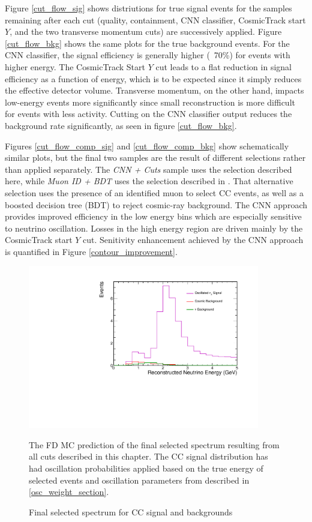 Figure \ref{cut_flow_sig} shows distriutions for true signal
events for the samples
remaining after each cut (quality, containment, CNN classifier,
CosmicTrack start
$Y$, and the two transverse momentum cuts) are successively applied.
Figure \ref{cut_flow_bkg} shows the same plots for the true background events.
For the CNN classifier, the signal efficiency is generally higher (~70\%)
for events with higher energy.
The CosmicTrack Start $Y$ cut leads to a flat reduction in signal efficiency
as a function of energy, which is to be expected since it simply reduces
the effective detector volume.
Transverse momentum, on the other hand, impacts low-energy events more
significantly since small reconstruction is more difficult for events
with less activity.
Cutting on the CNN classifier output reduces the background rate significantly,
as seen in figure \ref{cut_flow_bkg}.

Figures \ref{cut_flow_comp_sig} and \ref{cut_flow_comp_bkg} show
schematically similar plots, but the final two samples
are the result of different selections rather than applied separately.
The \textit{CNN + Cuts} sample uses the selection described here,
while \textit{Muon ID + BDT} uses the selection described in
\cite{nova2016numu}.
That alternative selection uses the presence of an identified muon
to select \numu CC events, as well as a boosted decision tree (BDT)
\cite{friedman2002stochastic} to reject cosmic-ray background.
The CNN approach provides improved efficiency in the low energy bins
which are especially sensitive to neutrino oscillation.
Losses in the high energy region are driven mainly by the CosmicTrack
start $Y$ cut.
Senitivity enhancement achieved by the CNN approach is quantified
in Figure \ref{contour_improvement}.


\begin{figure}
\begin{center}
\includegraphics[width=0.9\textwidth]{figures/selection/numuE.pdf}
\end{center}
\caption{Final selected spectrum for \numu CC signal and backgrounds }{
The FD MC prediction of the final selected spectrum resulting from all cuts
described in this chapter.
The \numu CC signal distribution has had oscillation probabilities applied
based on the true energy of selected events and oscillation parameters
from described in \ref{osc_weight_section}.
}
\label{final_selection}
\end{figure}



